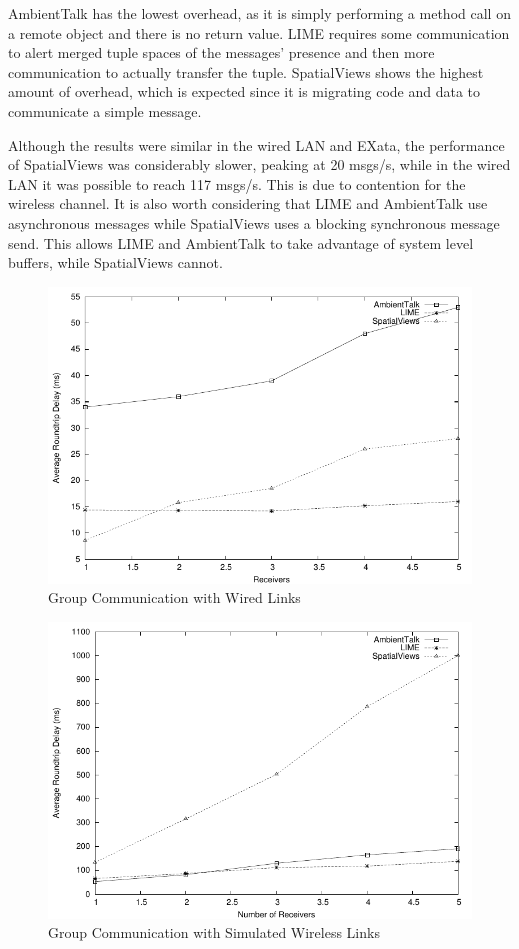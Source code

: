 AmbientTalk has the lowest overhead, as it is simply performing a method call on a remote object and there is no return value. LIME requires some communication to alert merged tuple spaces of the messages' presence and then more communication to actually transfer the tuple. SpatialViews shows the highest amount of overhead, which is expected since it is migrating code and data to communicate a simple message. 

Although the results were similar in the wired LAN and EXata, the performance of SpatialViews was considerably slower, peaking at 20 msgs/s, while in the wired LAN it was possible to reach 117 msgs/s. This is due to contention for the wireless channel. It is also worth considering that LIME and AmbientTalk use asynchronous messages while SpatialViews uses a blocking synchronous message send. This allows LIME and AmbientTalk to take advantage of system level buffers, while SpatialViews cannot.

\begin{figure}
\centering
\includegraphics{figures/multicast-wired.pdf}
\caption{Group Communication with Wired Links}
\label{fig:multicast-wired}
\end{figure}

\begin{figure}
\centering
\includegraphics{figures/multicast-qualnet.pdf}
\caption{Group Communication with Simulated Wireless Links}
\label{fig:multicast-qualnet}
\end{figure}

